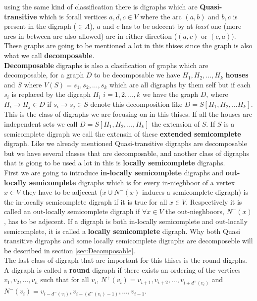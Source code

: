 using the same kind of classification there is digraphs which are \textbf{Quasi-transitive} which is forall vertices $a,d,c\in V$ where the arc $(a,b)$ and $b,c$ is present in the digraph ($\in A$), $a$ and $c$ has to be adecent by at \textit{least} one (more arcs in between are also allowed) arc in either direction ($(a,c)$ or $(c,a)$). These graphs are going to be mentioned a lot in this thises since the graph is also what we call \textbf{decomposable}.\\
\textbf{Decomposable} digraphs is also a clasification of graphs which are decomposable, for a graph $D$ to be decomposable we have $H_1,H_2, \dots , H_k$ \textbf{houses} and $S$ where $V(S)={s_1,s_2,\dots,s_k}$ which are all digraphs by them self but if each $s_i$ is replaced by the digraph $H_i$ $i=1,2,\dots,k$ we have the graph $D$, where $H_i\rightarrow H_j \in D$ if $s_i\rightarrow s_j\in S$  denote this decomposition like $D=S[H_1,H_2,\dots H_k]$.
This is the class of digraphs we are focusing on in this thises. 
If all the houses are independent sets we call $D=S[H_1,H_2,\dots ,H_k]$ the extension of $S$. 
If $S$ is a semicomplete digraph we call the extensin of these \textbf{extended semicomplete} digraph.
Like we already mentioned Quasi-transitive digraphs are decomposable but we have several classes that are decomposable, and another class of digraphs that is giong to be used a lot in this is \textbf{locally semicomplete} digraphs.\\
First we are going to introduce \textbf{in-locally semicomplete} digraphs and \textbf{out-locally semicomplete} digraphs which is for every in-nieghboor of a vertex $x\in V$ they have to be adjecent ($x\cup N^-(x)$ induces a semicomplete digraph) is the in-locally semicomplete digraph if it is true for all $x\in V$. 
Respectively it is called an out-locally semicomplete digraph if $\forall x\in V$ the out-nieghboors, $N^+(x)$, has to be adjecent. 
If a digraph is both in-locally semicomplete and out-locally semicomplete, it is called a \textbf{locally semicomplete} digraph. Why both Quasi transitive digraphs and some locally semicomplete digraphs are decomposeble will be described in section \autoref{sec:Decomposable}.\\
The last class of digraph that are important for this thises is the round digrphs. 
A digraph is called a \textbf{round} digraph if there exists an ordering of the vertices $v_1,v_2,\dots,v_n$ such that for all $v_i$, $N^+(v_i)={v_{i+1},v_{i+2},\dots ,v_{i+d^+(v_i)}}$ and $N^-(v_i)={v_{i-d^-(v_i)},v_{i-(d^-(v_i)-1)},\dots ,v_{i-1}}$.




